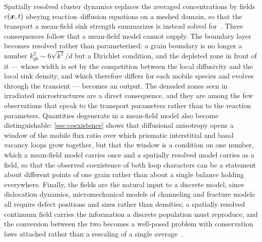 Spatially resolved cluster dynamics replaces the averaged concentrations by
fields $c(\bm{x},t)$ obeying reaction--diffusion equations on a meshed domain, so
that the transport a mean-field sink strength summarizes is instead solved
for~\citep{spatialCD2024,christien2009cluster,barashev2015theoretical}. Three
consequences follow that a mean-field model cannot supply. The boundary layer
becomes resolved rather than parameterized: a grain boundary is no longer a
number $k^{2}_{gb}\sim6\sqrt{k^{2}}/d$ but a Dirichlet condition, and the
depleted zone in front of it --- whose width is set by the competition between
the local diffusivity and the local sink density, and which therefore differs for
each mobile species and evolves through the transient --- becomes an output. The
denuded zones seen in irradiated microstructures are a direct consequence, and
they are among the few observations that speak to the transport parameters
rather than to the reaction parameters. Quantities degenerate in a mean-field
model also become distinguishable: \cref{sec:coexistence} shows that diffusional
anisotropy opens a window of the mobile flux ratio over which prismatic
interstitial and basal vacancy loops grow together, but that the window is a
condition on one number, which a mean-field model carries once and a spatially
resolved model carries as a field, so that the observed coexistence of both loop
characters can be a statement about different points of one grain rather than
about a single balance holding everywhere. Finally, the fields are the natural
input to a discrete model, since dislocation dynamics, micromechanical models of
channeling and fracture models all require defect positions and sizes rather than
densities; a spatially resolved continuum field carries the information a
discrete population must reproduce, and the conversion between the two becomes a
well-posed problem with conservation laws attached rather than a rescaling of a
single
average~\citep{li2025coupledCDDD,ji2022concurrent,li2020coupled}.

